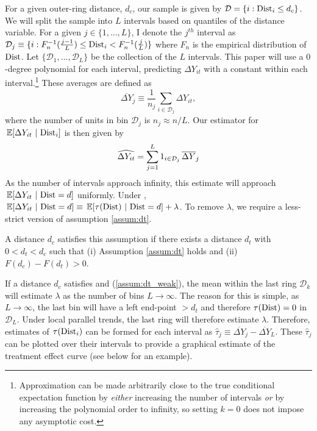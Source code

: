 For a given outer-ring distance, $d_c$, our sample is given by $\mathcal{D} = \{ i : \text{Dist}_i \leq d_c \}$. We will split the sample into $L$ intervals based on quantiles of the distance variable. For a given $j \in \{1, \dots, L\}$, I denote the $j^{th}$ interval as $\mathcal{D}_j \equiv\{ i : F_n^{-1}(\frac{j-1}{L}) \leq \text{Dist}_i < F_n^{-1}(\frac{j}{L}) \}$ where $F_n$ is the empirical distribution of $\text{Dist}$. Let $\{ \mathcal{D}_1, \dots, \mathcal{D}_L \}$ be the collection of the $L$ intervals. This paper will use a $0$-degree polynomial for each interval, predicting $\Delta Y_{it}$ with a constant within each interval.\footnote{Approximation can be made arbitrarily close to the true conditional expectation function by \textit{either} increasing the number of intervals \textit{or} by increasing the polynomial order to infinity, so setting $k = 0$ does not impose any asymptotic cost.} These averages are defined as 
\[
    \overline{\Delta Y}_j \equiv \frac{1}{n_j} \sum_{i \in \mathcal{D}_j} \Delta Y_{it},
\]
where the number of units in bin $\mathcal{D}_j$ is $n_j \approx n/L$. Our estimator for $\expec{\Delta Y_{it}}{\dist_i}$ is then given by
\[
    \widehat{\Delta Y_{it}} = \sum_{j = 1}^{L} \one_{i \in \mathcal{D}_j} \overline{\Delta Y}_j
\]
As the number of intervals approach infinity, this estimate will approach $\expec{\Delta Y_{it}}{\dist = d}$ uniformly. Under , $\expec{\Delta Y_{it}}{\dist = d} \equiv \expec{\tau(\dist)}{\dist = d} + \lambda$. To remove $\lambda$, we require a less-strict version of assumption \ref{assum:dt}.

\begin{assumption}[$d_t$ is within $d_c$]\label{assum:dt_weak}
    A distance $d_c$ satisfies this assumption if there exists a distance $d_t$ with $0 < d_t < d_c$ such that (i) Assumption \ref{assum:dt} holds and (ii) $F(d_c) - F(d_t) > 0$.
\end{assumption}

If a distance $d_c$ satisfies  and (\ref{assum:dt_weak}), the mean within the last ring $\mathcal{D}_k$ will estimate $\lambda$ as the number of bins $L \to \infty$. The reason for this is simple, as $L \to \infty$, the last bin will have a left end-point $> d_t$ and therefore $\tau(\text{Dist}) = 0$ in $\mathcal{D}_L$. Under local parallel trends, the last ring will therefore estimate $\lambda$. Therefore, estimates of $\tau(\text{Dist}_i)$ can be formed for each interval as $\hat{\tau}_j \equiv \overline{\Delta Y}_j - \overline{\Delta Y}_L$. These $\hat{\tau}_j$ can be plotted over their intervals to provide a graphical estimate of the treatment effect curve (see below for an example).

